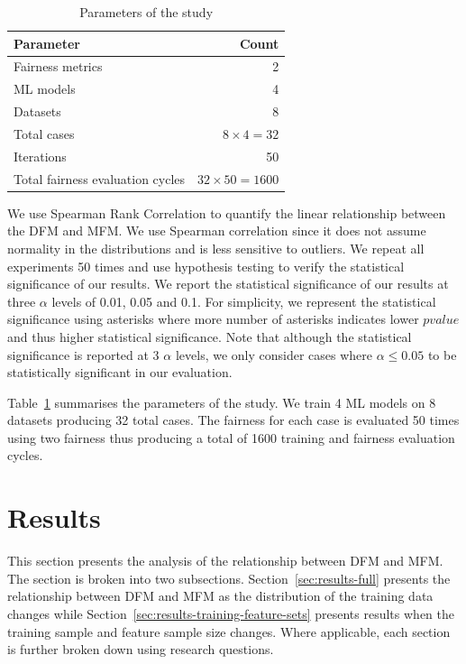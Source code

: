 \documentclass{article}
\begin{document}
\begin{table}
  \centering
  \begin{tabular}{lr}
    \toprule
    \textbf{Parameter} & \textbf{Count}\\
    \midrule
    Fairness metrics & 2\\
    ML models & 4\\
    Datasets & 8\\
    Total cases & $8\times4=32$\\
    Iterations & 50\\
    Total fairness evaluation cycles & $32\times50=1600$\\
    \bottomrule
  \end{tabular}
  \label{tab:parameters}
  \caption{Parameters of the study}
\end{table}

We use Spearman Rank Correlation to quantify the linear relationship
between the DFM and MFM. We use Spearman correlation since it does not
assume normality in the distributions and is less sensitive to
outliers. We repeat all experiments 50 times and use hypothesis
testing to verify the statistical significance of our results. We
report the statistical significance of our results at three $\alpha$
levels of 0.01, 0.05 and 0.1. For simplicity, we represent the
statistical significance using asterisks where more number of
asterisks indicates lower $pvalue$ and thus higher statistical
significance. Note that although the statistical significance is
reported at 3 $\alpha$ levels, we only consider cases where
$\alpha\le0.05$ to be statistically significant in our evaluation.

Table \ref{tab:parameters} summarises the parameters of the study. We
train 4 ML models on 8 datasets producing 32 total cases. The fairness
for each case is evaluated 50 times using two fairness thus producing
a total of 1600 training and fairness evaluation cycles.

\section{Results}\label{sec:results}

This section presents the analysis of the relationship between DFM and
MFM. The section is broken into two subsections.
Section \ref{sec:results-full} presents the relationship between DFM
and MFM as the distribution of the training data changes while
Section \ref{sec:results-training-feature-sets} presents results when
the training sample and feature sample size changes. Where applicable,
each section is further broken down using research questions.
\end{document}
